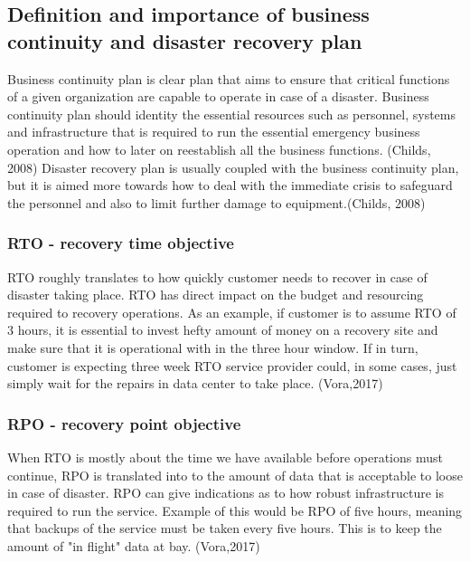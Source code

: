 \documentclass{article}
\begin{document}
\subsection{Definition and importance of business continuity  and disaster recovery plan}
Business continuity plan is clear plan that aims to ensure that critical functions of a given organization are capable to operate in case of a disaster.
Business continuity plan should identity the essential resources such as personnel, systems and infrastructure that is required to run the essential emergency business operation and how to later on reestablish all the business functions. (Childs, 2008)
Disaster recovery plan is usually coupled with the business continuity plan, but it is aimed more towards how to deal with the immediate crisis to safeguard the personnel and also to limit further damage to equipment.(Childs, 2008)
\subsubsection{RTO - recovery time objective}
RTO roughly translates to how quickly customer needs to recover in case of disaster taking place. RTO has direct impact on the budget and resourcing required to recovery operations. As an example, if customer is to assume RTO of 3 hours, it is essential to invest hefty amount of money on a recovery site and make sure that it is operational with in the three hour window. If in turn, customer is expecting three week RTO service provider could, in some cases, just simply wait for the repairs in data center to take place. (Vora,2017)
\subsubsection{RPO - recovery point objective}
When RTO is mostly about the time we have available before operations must continue, RPO is translated into to the amount of data that is acceptable to loose in case of disaster. RPO can give indications as to how robust infrastructure is required to run the service. Example of this would be RPO of five hours, meaning that backups of the service must be taken every five hours. This is to keep the amount of "in flight" data at bay. (Vora,2017)
\end{document}
